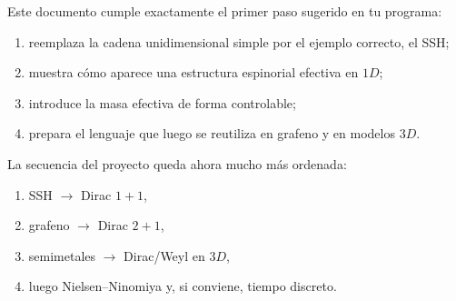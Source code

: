 Este documento cumple exactamente el primer paso sugerido en tu programa:

\begin{enumerate}[leftmargin=*]
  \item reemplaza la cadena unidimensional simple por el ejemplo correcto, el SSH;
  \item muestra cómo aparece una estructura espinorial efectiva en \(1D\);
  \item introduce la masa efectiva de forma controlable;
  \item prepara el lenguaje que luego se reutiliza en grafeno y en modelos \(3D\).
\end{enumerate}

La secuencia del proyecto queda ahora mucho más ordenada:

\begin{enumerate}[leftmargin=*]
  \item SSH \(\rightarrow\) Dirac \(1+1\),
  \item grafeno \(\rightarrow\) Dirac \(2+1\),
  \item semimetales \(\rightarrow\) Dirac/Weyl en \(3D\),
  \item luego Nielsen--Ninomiya y, si conviene, tiempo discreto.
\end{enumerate}
